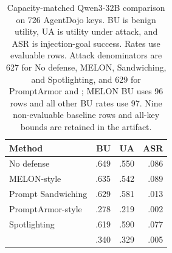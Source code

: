 \begin{table}[t]
\centering
\small
\caption{Capacity-matched Qwen3-32B comparison on 726 AgentDojo keys. BU is benign utility, UA is utility under attack, and ASR is injection-goal success. Rates use evaluable rows. Attack denominators are 627 for No defense, MELON, Sandwiching, and Spotlighting, and 629 for PromptArmor and \sys{}; MELON BU uses 96 rows and all other BU rates use 97. Nine non-evaluable baseline rows and all-key bounds are retained in the artifact.}
\label{tab:e78-qwen32-baselines}
\begin{tabular}{lrrr}
\toprule
Method & BU & UA & ASR \\
\midrule
No defense & .649 & .550 & .086 \\
MELON-style & .635 & .542 & .089 \\
Prompt Sandwiching & .629 & .581 & .013 \\
PromptArmor-style & .278 & .219 & .002 \\
Spotlighting & .619 & .590 & .077 \\
\sys{} & .340 & .329 & .005 \\
\bottomrule
\end{tabular}
\end{table}
